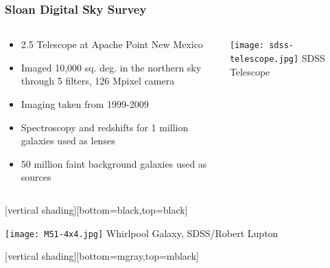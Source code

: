 \documentclass{beamer}
\begin{document}
\frame
{
    \frametitle{Sloan Digital Sky Survey}

    \begin{columns}
        \begin{column}{0.5\textwidth}    
            \begin{itemize}

                \item 2.5 Telescope at Apache Point New Mexico

                \item Imaged 10,000 sq. deg. in the northern sky through 5
                    filters, 126 Mpixel camera

                \item Imaging taken from 1999-2009

                \item Spectroscopy and redshifts for 1 million galaxies used
                    as {\color{gold} lenses }

                \item 50 million faint background galaxies used as {\color{gold} sources}
                    
            \end{itemize}
        \end{column}
        \begin{column}{0.5\textwidth}
            \begin{center}
                \texttt{[image: sdss-telescope.jpg]}
                \newline
                {\tiny SDSS Telescope}
            \end{center}
        \end{column}
    \end{columns}
}

{
    [vertical shading][bottom=black,top=black]

    \frame
    {	

        \begin{center}
            \texttt{[image: M51-4x4.jpg]}
            \newline
            \hfill {\tiny Whirlpool Galaxy, SDSS/Robert Lupton}
        \end{center}

    }
    [vertical shading][bottom=mgray,top=mblack]
}
\end{document}
